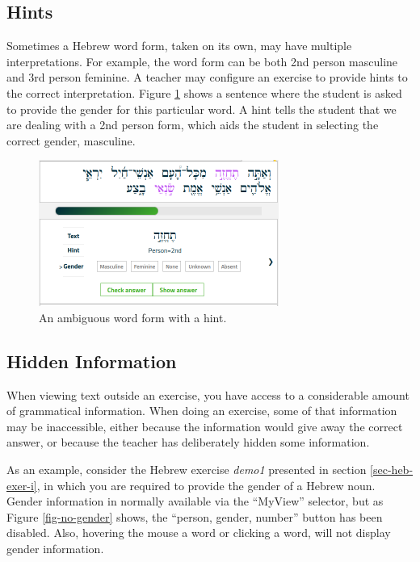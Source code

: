\documentclass[11pt,oneside,a4paper]{memoir}
\newcommand{\heb}[1]{{\RL {\ezr #1}}}
\begin{document}
\subsection{Hints}

Sometimes a Hebrew word form, taken on its own, may have multiple interpretations. For example, the
word form \heb{תֶחֱזֶה} can be both 2nd person masculine and 3rd person feminine. A teacher may
configure an exercise to provide hints to the correct interpretation. Figure \ref{fig-ambig} shows
a sentence where the student is asked to provide the gender for this particular word. A hint tells
the student that we are dealing with a 2nd person form, which aids the student in selecting the
correct gender, masculine.

\begin{figure}
  \begin{center}
    \includegraphics[width=0.7\textwidth]{fig-ambig.png}
  \end{center}
  \caption{An ambiguous word form with a hint.}\label{fig-ambig}
\end{figure}


\subsection{Hidden Information}

When viewing text outside an exercise, you have access to a considerable amount of grammatical
information. When doing an exercise, some of that information may be inaccessible, either because
the information would give away the correct answer, or because the teacher has deliberately hidden
some information.

As an example, consider the Hebrew exercise \emph{demo1} presented in section \ref{sec-heb-exer-i}, in
which you are required to provide the gender of a Hebrew noun. Gender information in normally
available via the ``MyView'' selector, but as Figure \ref{fig-no-gender} shows, the ``person,
gender, number'' button has been disabled. Also, hovering the mouse a word or clicking a word, will
not display gender information.
\end{document}

